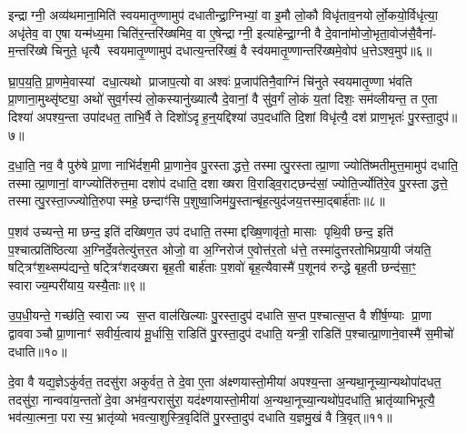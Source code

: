 {\anuvakamend[{कॢप्त्या॑ उप॒धाय॑ प्राण॒भृतः॒ सम॑नसः कृ॒ष्णे पुरु॑षो॒ वय॒ इति॒ पञ्च॑ च॥१॥}]}

इन्द्राग्नी॒ अव्य॑थमाना॒मिति॑ स्वयमातृ॒ण्णामुप॑ दधातीन्द्रा॒ग्निभ्यां॒ वा इ॒मौ लो॒कौ विधृ॑ताव॒नयोर्लो॒कयो॒र्विधृ॑त्या॒ अधृ॑तेव॒ वा ए॒षा यन्म॑ध्य॒मा चिति॑र॒न्तरि॑ख्षमिव॒ वा ए॒षेन्द्राग्नी॒ इत्या॑हेन्द्रा॒ग्नी वै दे॒वाना॑मोजो॒भृता॒वोज॑सै॒वैना॑- म॒न्तरि॑ख्षे चिनुते॒ धृत्यै स्वयमातृ॒ण्णामुप॑ दधात्य॒न्तरि॑ख्षं॒ वै स्व॑यमातृ॒ण्णान्तरि॑ख्षमे॒वोप॑ ध॒त्तेऽश्व॒मुप॑॥६॥

घ्रा॒प॒य॒ति॒ प्रा॒णमे॒वास्यां दधा॒त्यथो प्राजाप॒त्यो वा अश्वः॑ प्र॒जाप॑तिनै॒वाग्निं चि॑नुते स्वयमातृ॒ण्णा भ॑वति प्रा॒णाना॒मुथ्सृ॑ष्ट्या॒ अथो॑ सुव॒र्गस्य॑ लो॒कस्यानु॑ख्यात्यै दे॒वानां॒ वै सु॑व॒र्गं लो॒कं य॒तां दिशः॒ सम॑व्लीयन्त॒ त ए॒ता दिश्या॑ अपश्य॒न्ता उपा॑दधत॒ ताभि॒र्वै ते दिशो॑ऽदृह॒न्॒यद्दिश्या॑ उप॒दधा॑ति दि॒शां विधृ॑त्यै॒ दश॑ प्राण॒भृतः॑ पु॒रस्ता॒दुप॑॥७॥

द॒धा॒ति॒ नव॒ वै पुरु॑षे प्रा॒णा नाभि॑र्दश॒मी प्रा॒णाने॒व पु॒रस्ताद्धत्ते॒ तस्मात्पु॒रस्तात्प्रा॒णा ज्योति॑ष्मतीमुत्त॒मामुप॑ दधाति॒ तस्मात्प्रा॒णानां॒ वाग्ज्योति॑रुत्त॒मा दशोप॑ दधाति॒ दशाख्षरा वि॒राड्वि॒राट्छन्द॑सां॒ ज्योति॒र्ज्योति॑रे॒व पु॒रस्ताद्धत्ते॒ तस्मात्पु॒रस्ता॒ज्ज्योति॒रुपास्महे॒ छन्दाꣳ॑सि प॒शुष्वा॒जिम॑यु॒स्तान्बृ॑ह॒त्युद॑जय॒त्तस्मा॒द्बार्\mbox{}ह॑ताः॥८॥

प॒शव॑ उच्यन्ते॒ मा छन्द॒ इति॑ दख्षिण॒त उप॑ दधाति॒ तस्माद्दख्षि॒णावृ॑तो॒ मासाः पृथि॒वी छन्द॒ इति॑ प॒श्चात्प्रति॑ष्ठित्या अ॒ग्निर्दे॒वतेत्यु॑त्तर॒त ओजो॒ वा अ॒ग्निरोज॑ ए॒वोत्त॑र॒तो ध॑त्ते॒ तस्मा॑दुत्तरतोभिप्रया॒यी ज॑यति॒ षट्त्रिꣳ॑श॒थ्सम्प॑द्यन्ते॒ षट्त्रिꣳ॑शदख्षरा बृह॒ती बार्\mbox{}ह॑ताः प॒शवो॑ बृह॒त्यैवास्मै॑ प॒शूनव॑ रुन्द्धे बृह॒ती छन्द॑सा॒ꣳ॒ स्वाराज्य॒म्परी॑याय॒ यस्यै॒ताः॥९॥

उ॒प॒धी॒यन्ते॒ गच्छ॑ति॒ स्वाराज्य स॒प्त वाल॑खिल्याः पु॒रस्ता॒दुप॑ दधाति स॒प्त प॒श्चात्स॒प्त वै शी॑र्\mbox{}ष॒ण्याः प्रा॒णा द्वाववाञ्चौ प्रा॒णानाꣳ॑ सवीर्य॒त्वाय॑ मू॒र्धासि॒ राडिति॑ पु॒रस्ता॒दुप॑ दधाति॒ यन्त्री॒ राडिति॑ प॒श्चात्प्रा॒णाने॒वास्मै॑ स॒मीचो॑ दधाति॥१०॥

{\anuvakamend[{अश्व॒मुप॑ पु॒रस्ता॒दुप॒ बार्\mbox{}ह॑ता ए॒ताश्चतु॑स्त्रिशच्च॥२॥}]}

दे॒वा वै यद्य॒ज्ञेऽकु॑र्वत॒ तदसु॑रा अकुर्वत॒ ते दे॒वा ए॒ता अ॑क्ष्णयास्तो॒मीया॑ अपश्य॒न्ता अ॒न्यथा॒नूच्या॒न्यथोपा॑दधत॒ तदसु॑रा॒ नान्ववा॑य॒न्ततो॑ दे॒वा अभ॑व॒न्परासु॑रा॒ यद॑क्ष्णयास्तो॒मीया॑ अ॒न्यथा॒नूच्या॒न्यथो॑प॒दधा॑ति॒ भ्रातृ॑व्याभिभूत्यै॒ भव॑त्या॒त्मना॒ परास्य॒ भ्रातृ॑व्यो भवत्या॒शुस्त्रि॒वृदिति॑ पु॒रस्ता॒दुप॑ दधाति य॒ज्ञमु॒खं वै त्रि॒वृत्॥११॥

